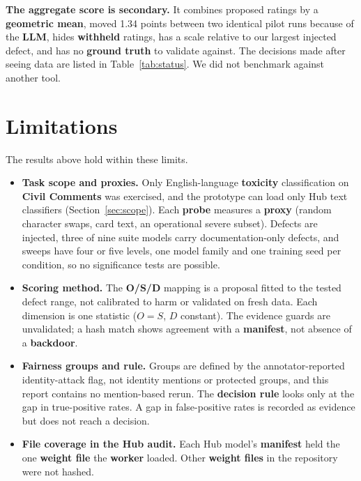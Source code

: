 \textbf{The aggregate score is secondary.} It combines proposed ratings by a \textbf{geometric mean}, moved 1.34 points between two identical pilot runs because of the \textbf{LLM}, hides \textbf{withheld} ratings, has a scale relative to our largest injected defect, and has no \textbf{ground truth} to validate against. The decisions made after seeing data are listed in Table~\ref{tab:status}. We did not benchmark against another tool.

\section{Limitations}\label{ch:limits}
The results above hold within these limits.
\begin{itemize}[itemsep=0.1em]
\item \textbf{Task scope and proxies.} Only English-language \textbf{toxicity} classification on \textbf{Civil Comments} was exercised, and the prototype can load only Hub text classifiers (Section~\ref{sec:scope}). Each \textbf{probe} measures a \textbf{proxy} (random character swaps, card text, an operational severe subset). Defects are injected, three of nine suite models carry documentation-only defects, and sweeps have four or five levels, one model family and one training seed per condition, so no significance tests are possible.
\item \textbf{Scoring method.} The \textbf{O/S/D} mapping is a proposal fitted to the tested defect range, not calibrated to harm or validated on fresh data. Each dimension is one statistic ($O=S$, $D$ constant). The evidence guards are unvalidated; a hash match shows agreement with a \textbf{manifest}, not absence of a \textbf{backdoor}.
\item \textbf{Fairness groups and rule.} Groups are defined by the annotator-reported identity-attack flag, not identity mentions or protected groups, and this report contains no mention-based rerun. The \textbf{decision rule} looks only at the gap in true-positive rates. A gap in false-positive rates is recorded as evidence but does not reach a decision.
\item \textbf{File coverage in the Hub audit.} Each Hub model's \textbf{manifest} held the one \textbf{weight file} the \textbf{worker} loaded. Other \textbf{weight files} in the repository were not hashed.

\end{itemize}
